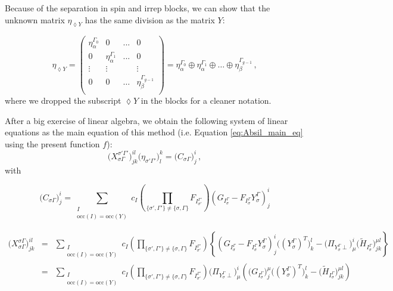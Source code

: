 \documentclass[a4paper,11pt]{article}
\begin{document}
Because of the separation in spin and irrep blocks, we can show that the unknown matrix $\eta_{\lozenge Y}$ has the same division as the matrix $Y$:

\begin{equation}\label{eq:eta_spin_irrep_blocks}
  \eta_{\lozenge Y} =
  \begin{pmatrix}
    \eta_\alpha^{\Gamma_0} & 0 & ... & 0\\
    0 & \eta_\alpha^{\Gamma_1} & ... & 0 \\
    \vdots & \vdots & & \vdots\\
    0 & 0 &\dots & \eta_\beta^{\Gamma_{g-1}}\\
  \end{pmatrix}
  = \eta_\alpha^{\Gamma_0} \oplus \eta_\alpha^{\Gamma_1} \oplus \dots \oplus \eta_\beta^{\Gamma_{g-1}}\,,
\end{equation}
where we dropped the subscript $\lozenge Y$ in the blocks for a cleaner notation.

After a big exercise of linear algebra, we obtain the following system of linear equations as the main equation of this method (i.e. Equation \ref{eq:Absil_main_eq} using the present function $f$):
\begin{equation}
  \big( X_{\sigma \Gamma}^{\sigma' \Gamma'} \big)_{jk}^{il} \big( \eta_{\sigma' \Gamma'} \big)_{l}^{k} = \big( C_{\sigma \Gamma} \big)_{j}^{i}\,,
\end{equation}
with


\begin{equation}
  \big( C_{\sigma \Gamma} \big)_{j}^{i} =
  \sum_{\substack{I\\\text{occ}(I) = \text{occ}(Y)}} c_I
  \left( \prod_{\{\sigma', \Gamma'\} \ne \{\sigma, \Gamma\}} F_{I_{\sigma'}^{\Gamma'}} \right)
  \left( G_{I_\sigma^\Gamma} - F_{I_\sigma^\Gamma} Y_\sigma^\Gamma  \right)_j^i
\end{equation}

\begin{eqnarray}
  \big( X_{\sigma \Gamma}^{\sigma \Gamma} \big)_{jk}^{il} &=&
  \sum_{\substack{I\\\text{occ}(I) = \text{occ}(Y)}} c_I
  \left( \prod_{\{\sigma', \Gamma'\} \ne \{\sigma, \Gamma\}} F_{I_{\sigma'}^{\Gamma'}} \right)
  \left\{ \left( G_{I_\sigma^\Gamma} - F_{I_\sigma^\Gamma} Y_\sigma^\Gamma  \right)_j^i \big( (Y_\sigma^\Gamma)^T \big)_k^l
  - \big( \Pi_{Y_\sigma^\Gamma \perp} \big)_\mu^i \big( \tilde{H}_{I_\sigma^\Gamma} \big)_{jk}^{\mu l} \right\}\\
  &=& 
  \sum_{\substack{I\\\text{occ}(I) = \text{occ}(Y)}} c_I
  \left( \prod_{\{\sigma', \Gamma'\} \ne \{\sigma, \Gamma\}} F_{I_{\sigma'}^{\Gamma'}} \right)
  \big( \Pi_{Y_\sigma^\Gamma \perp} \big)_\mu^i
  \left( \big( G_{I_\sigma^\Gamma} \big)_j^\mu \big( (Y_\sigma^\Gamma)^T \big)_k^l
  - \big( \tilde{H}_{I_\sigma^\Gamma} \big)_{jk}^{\mu l} \right)
\end{eqnarray}
\end{document}
